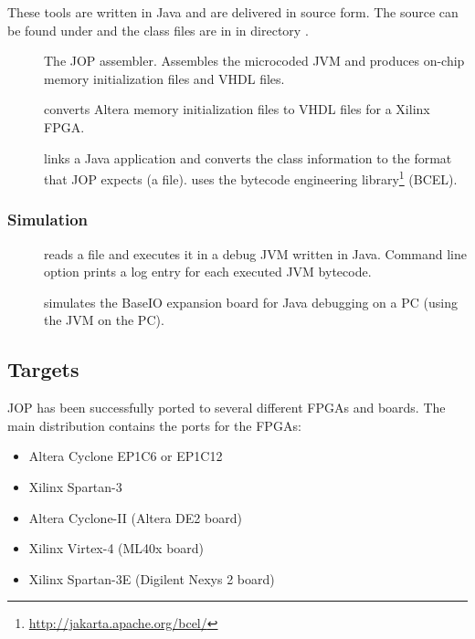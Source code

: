 These tools are written in Java and are delivered in source form.
The source can be found under  and the class
files are in  in directory
.

\begin{description}
    \item[] The JOP assembler. Assembles the microcoded
    JVM and produces on-chip memory initialization files and VHDL
    files.
    \item[] converts Altera memory initialization
        files to VHDL files for a Xilinx FPGA.
    \item[] links a Java application and converts the
    class information to the format that JOP expects (a  file).
     uses the bytecode engineering library\footnote{\url{http://jakarta.apache.org/bcel/}} (BCEL).

\end{description}

\subsubsection{Simulation}

\begin{description}
    \item[] reads a  file and executes it in
    a debug JVM written in Java. Command line option
     prints a log entry for each executed JVM
    bytecode.
    \item[] simulates the BaseIO expansion board for Java
    debugging on a PC (using the JVM on the PC).
\end{description}

\subsection{Targets}

JOP has been successfully ported to several different FPGAs and
boards. The main distribution contains the ports for the FPGAs:

\begin{itemize}
    \item Altera Cyclone EP1C6 or EP1C12
    \item Xilinx Spartan-3
    \item Altera Cyclone-II (Altera DE2 board)
    \item Xilinx Virtex-4 (ML40x board)
    \item Xilinx Spartan-3E (Digilent Nexys 2 board)
\end{itemize}

